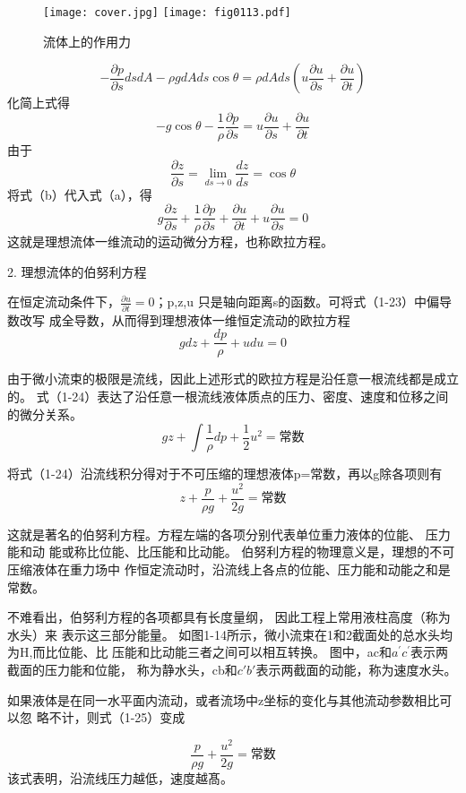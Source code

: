\begin{figure}
  \centering
  \ifOpenSource
  \texttt{[image: cover.jpg]}
  \else
  \texttt{[image: fig0113.pdf]}%
  \fi
  \caption{流体上的作用力}
  \label{fig:0113}%
  \end{figure}
\[ - \frac{{\partial p}}{{\partial s}}dsdA - \rho gdAds\cos \theta  = \rho dAds\left( {u\frac{{\partial u}}{{\partial s}} + \frac{{\partial u}}{{\partial t}}} \right)\]
化简上式得
\[ - g\cos \theta  - \frac{1}{\rho }\frac{{\partial p}}{{\partial s}} = u\frac{{\partial u}}{{\partial s}} + \frac{{\partial u}}{{\partial t}}\]
由于
\[\frac{{\partial z}}{{\partial s}} = \mathop {\lim }\limits_{ds \to 0} \frac{{dz}}{{ds}} = \cos \theta \]
将式（b）代入式（a），得
\[g\frac{{\partial z}}{{\partial s}} + \frac{1}{\rho }\frac{{\partial p}}{{\partial s}} + \frac{{\partial u}}{{\partial t}} + u\frac{{\partial u}}{{\partial s}} = 0\]
这就是理想流体一维流动的运动微分方程，也称欧拉方程。

2.	理想流体的伯努利方程

在恒定流动条件下，$ \frac{{\partial u}}{{\partial t}}=0 $；p,z,u
只是轴向距离s的函数。可将式（1-23）中偏导数改写
成全导数，从而得到理想液体一维恒定流动的欧拉方程
\[gdz + \frac{{dp}}{\rho } + udu = 0\]

由于微小流束的极限是流线，因此上述形式的欧拉方程是沿任意一根流线都是成立的。
式（1-24）表达了沿任意一根流线液体质点的压力、密度、速度和位移之间的微分关系。
$$gz + \int {\frac{1}{\rho }} dp + \frac{1}{2}{u^2} = \text{常数} $$ 

将式（1-24）沿流线积分得对于不可压缩的理想液体p=常数，再以g除各项则有
$$z + \frac{p}{{\rho g}} + \frac{{{u^2}}}{{2g}} =\text{常数} $$ 

这就是著名的伯努利方程。方程左端的各项分别代表单位重力液体的位能、
压力能和动 能或称比位能、比压能和比动能。
伯努利方程的物理意义是，理想的不可压缩液体在重力场中 
作恒定流动时，沿流线上各点的位能、压力能和动能之和是常数。


不难看出，伯努利方程的各项都具有长度量纲，
因此工程上常用液柱高度（称为水头）来 表示这三部分能量。
如图1-14所示，微小流束在1和2截面处的总水头均为H,而比位能、比
压能和比动能三者之间可以相互转换。
图中，ac和$a^{'}c^{'}$表示两截面的压力能和位能，
称为静水头，cb和$c{'}b{'}$表示两截面的动能，称为速度水头。

如果液体是在同一水平面内流动，或者流场中z坐标的变化与其他流动参数相比可以忽 略不计，则式（1-25）变成 

$$\frac{p}{{\rho g}} + \frac{{{u^2}}}{{2g}} =\text{常数} $$ 
该式表明，沿流线压力越低，速度越髙。


